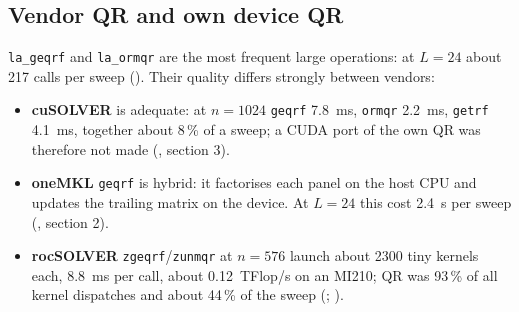 
\subsection{Vendor QR and own device QR}
\label{sec:ownqr}

\texttt{la\_geqrf} and \texttt{la\_ormqr} are the most frequent large operations: at $L=24$ about 217 calls per sweep (). Their quality differs strongly between vendors:
\begin{itemize}
\item \textbf{cuSOLVER} is adequate: at $n=1024$ \texttt{geqrf} 7.8~ms, \texttt{ormqr} 2.2~ms, \texttt{getrf} 4.1~ms, together about 8\,\% of a sweep; a CUDA port of the own QR was therefore not made (, section 3). %
\item \textbf{oneMKL} \texttt{geqrf} is hybrid: it factorises each panel on the host CPU and updates the trailing matrix on the device. At $L=24$ this cost 2.4~s per sweep (, section 2). %
\item \textbf{rocSOLVER} \texttt{zgeqrf}/\texttt{zunmqr} at $n=576$ launch about 2300 tiny kernels each, 8.8~ms per call, about 0.12~TFlop/s on an MI210; QR was 93\,\% of all kernel dispatches and about 44\,\% of the sweep (; ). %
\end{itemize}


